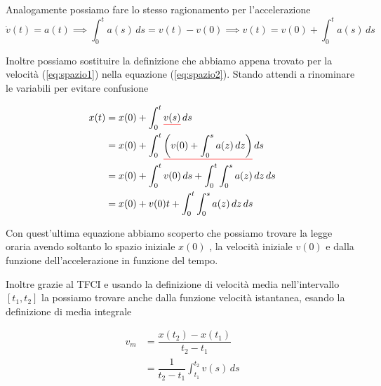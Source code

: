 \documentclass{rapport}
\def\mathunderline#1#2{\color{#1}\underline{{\color{black}#2}}\color{black}}
\begin{document}
Analogamente possiamo fare lo stesso ragionamento per l'accelerazione
\begin{equation}
  \label{eq:spazio2}
\dot{v}(t) = a(t) \implies \int_{0}^{t} a(s) \,ds = v(t) - v(0) \implies v(t) = v(0) + \int_{0}^{t} a(s) \,ds 
\end{equation}

Inoltre possiamo sostituire la definizione che abbiamo appena trovato per la velocità (\ref{eq:spazio1}) nella equazione (\ref{eq:spazio2}). Stando attendi a rinominare le variabili per evitare confusione

\begin{align*}
  x(t) &= x(0) + \int_{0}^{t} \mathunderline{red}{v(s)} \,ds \\
  &= x(0) + \int_{0}^{t} \mathunderline{red}{\left(v(0) + \int_{0}^{s} a(z) \,dz\right)}  \,ds  \\
   &= x(0) + \int_{0}^{t} v(0)\,ds + \int_{0}^{t}\int_{0}^{s} a(z) \,dz  \,ds \\
   &= x(0) +v(0)t + \int_{0}^{t}\int_{0}^{s} a(z) \,dz  \,ds \\
\end{align*}

Con quest'ultima equazione abbiamo scoperto che possiamo trovare la legge oraria avendo soltanto lo spazio iniziale $x(0)$ , la velocità iniziale $v(0)$ e dalla funzione dell'accelerazione in funzione del tempo.


Inoltre grazie al TFCI e usando la definizione di velocità media nell'intervallo $[t_1, t_2]$ la possiamo trovare anche dalla funzione velocità istantanea, esando la definizione di media integrale 

\begin{align*}
v_m &= \dfrac{x(t_2)-x(t_1)}{t_2-t_1}  \\
&= \dfrac{1}{t_2-t_1} \int_{t_1}^{t_2} v(s) \,ds
\end{align*}
\end{document}
